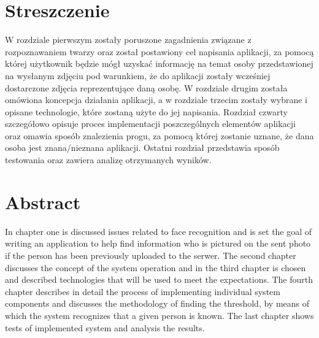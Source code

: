 \section*{Streszczenie}

W rozdziale pierwszym zostały poruszone zagadnienia związane z rozpoznawaniem twarzy oraz został
postawiony cel napisania aplikacji, za pomocą której użytkownik będzie mógł uzyskać informację na temat
osoby przedstawionej na wysłanym zdjęciu pod warunkiem,
że do aplikacji zostały wcześniej dostarczone zdjęcia reprezentujące daną osobę.
W rozdziale drugim została omówiona koncepcja działania aplikacji,
a w rozdziale trzecim zostały wybrane i opisane
technologie, które zostaną użyte do jej napisania.
Rozdział czwarty szczegółowo opisuje proces implementacji poszczególnych elementów
aplikacji oraz omawia
sposób znalezienia progu, za pomocą której zostanie uznane,
że dana osoba jest znana/nieznana aplikacji.
Ostatni rozdział przedstawia sposób testowania
oraz zawiera analizę otrzymanych wyników.


\section*{Abstract}

In chapter one is discussed issues related to face recognition and is set the goal of writing an application
to help find information who is pictured on the sent photo if the person has been previously uploaded to the serwer.
The second chapter discusses the concept of the system operation
and in the third chapter is chosen and described technologies that will be used to meet the expectations.
The fourth chapter describes in detail the process of implementing individual
system components and discusses the methodology of finding the threshold,
by means of which the system recognizes that a given person is known.
The last chapter shows tests of implemented system and analysis the results.